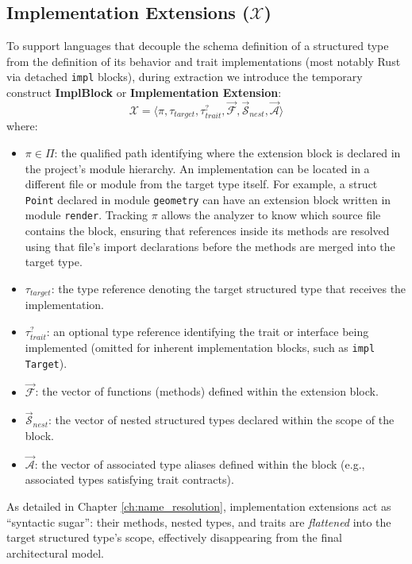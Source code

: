 \subsection{Implementation Extensions ($\mathcal{X}$)}
To support languages that decouple the schema definition of a structured
type from the definition of its behavior and trait implementations (most
notably Rust via detached \texttt{impl} blocks), during extraction we
introduce the temporary construct \textbf{ImplBlock} or
\textbf{Implementation Extension}:
$$\mathcal{X} = \langle \pi, \tau_{target}, \tau_{trait}^?,
\vec{\mathcal{F}}, \vec{\mathcal{S}}_{nest}, \vec{\mathcal{A}} \rangle$$
where:
\begin{itemize}
  \item $\pi \in \Pi$: the qualified path identifying where the
    extension block is
    declared in the project's module hierarchy.
    An implementation can be located in a different file or module
    from the target type itself. For example, a struct \texttt{Point}
    declared in module \texttt{geometry} can have an extension block
    written in module \texttt{render}. Tracking $\pi$ allows the
    analyzer to know which source file contains the block, ensuring
    that references inside its methods are resolved using that file's
    import declarations before the methods are merged into the target type.
  \item $\tau_{target}$: the type reference denoting the target structured type
    that receives the implementation.
  \item $\tau_{trait}^?$: an optional type reference identifying the trait or
    interface being implemented (omitted for inherent implementation
      blocks, such
    as \texttt{impl Target}).
  \item $\vec{\mathcal{F}}$: the vector of functions (methods)
    defined within the
    extension block.
  \item $\vec{\mathcal{S}}_{nest}$: the vector of nested structured
    types declared
    within the scope of the block.
  \item $\vec{\mathcal{A}}$: the vector of associated type aliases
    defined within
    the block (e.g., associated types satisfying trait contracts).
\end{itemize}

%
As detailed in Chapter \ref{ch:name_resolution}, implementation
extensions act as ``syntactic sugar'': their methods, nested types,
and traits are \textit{flattened} into the target structured type's
scope, effectively disappearing from the final architectural model.

